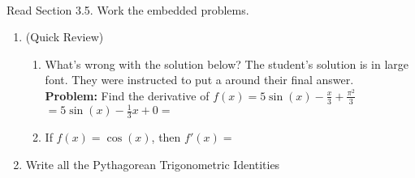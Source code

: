 \documentclass[11pt,fleqn]{article}
\begin{document}
\renewcommand{\headrulewidth}{0pt}
\newcommand{\blank}[1]{\rule{#1}{0.75pt}}
\newcommand{\bc}{\begin{center}}
\newcommand{\ec}{\end{center}}
\renewcommand{\d}{\displaystyle}

\vspace*{-0.7in}

\begin{center}
  \large
  \\
\end{center}
Read Section 3.5. Work the embedded problems. \\
\begin{enumerate}
\item (Quick Review) 
\begin{enumerate} 
	\item What's wrong with the solution below? The student's solution is in {\huge{{large}}} font. They were instructed to put a  around their final answer.\\
	
	\textbf{Problem:} Find the derivative of $f(x)=5\sin(x)-\frac{x}{3}+\frac{\pi^2}{3}$\\ 
	
	{\huge{\bf{$=5\sin(x) - \frac{1}{3} x + 0=$}}} 
	\item If $f(x)=\cos(x)$, then $f'(x)=$\\
\end{enumerate}
\item Write all the Pythagorean Trigonometric Identities\\
\vfill


\end{enumerate}
\end{document}
